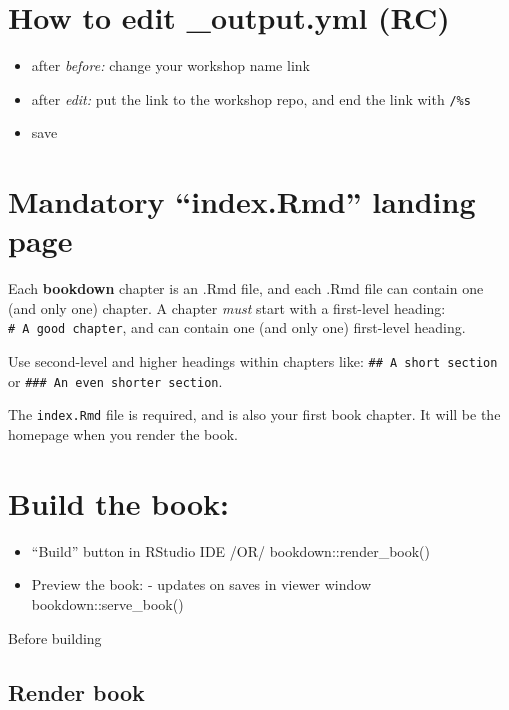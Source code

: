 \documentclass[
]{book}
\providecommand{\tightlist}{%
  \setlength{\itemsep}{0pt}\setlength{\parskip}{0pt}}
\theoremstyle{definition}
\theoremstyle{definition}
\theoremstyle{definition}
\theoremstyle{definition}
\theoremstyle{remark}
\begin{document}
\section{How to edit \_output.yml (RC)}\label{how-to-edit-_output.yml-rc}

\begin{itemize}
\tightlist
\item
  after \emph{before:} change your workshop name link
\item
  after \emph{edit:} put the link to the workshop repo, and end the link with \texttt{/\%s}
\item
  save
\end{itemize}

\section{Mandatory ``index.Rmd'' landing page}\label{mandatory-index.rmd-landing-page}

Each \textbf{bookdown} chapter is an .Rmd file, and each .Rmd file can contain one (and only one) chapter. A chapter \emph{must} start with a first-level heading: \texttt{\#\ A\ good\ chapter}, and can contain one (and only one) first-level heading.

Use second-level and higher headings within chapters like: \texttt{\#\#\ A\ short\ section} or \texttt{\#\#\#\ An\ even\ shorter\ section}.

The \texttt{index.Rmd} file is required, and is also your first book chapter. It will be the homepage when you render the book.

\section{Build the book:}\label{build-the-book-1}

\begin{itemize}
\tightlist
\item
  ``Build'' button in RStudio IDE /OR/ bookdown::render\_book()
\item
  Preview the book: - updates on saves in viewer window bookdown::serve\_book()
\end{itemize}

Before building

\subsection{Render book}\label{render-book}
\end{document}
